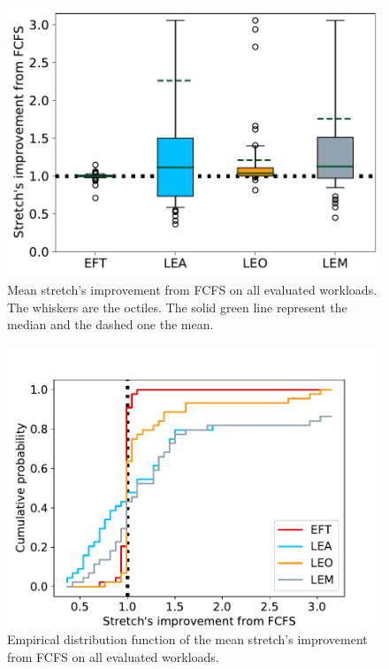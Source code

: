 \documentclass[conference,10pt]{IEEEtran}
\begin{document}
\begin{figure}[t]\centering\includegraphics[width=0.9\linewidth]{../MBSS/plot/Boxplot/box_plot_mean_stretch_all_workloads.pdf}\caption{Mean stretch's improvement from FCFS on all evaluated workloads. The whiskers are the octiles. The solid green line represent the median and the dashed one the mean.}\label{boxplot.all}\end{figure}
\begin{figure}[t]\centering\includegraphics[width=0.9\linewidth]{../MBSS/plot/ECDF/ecdf_mean_stretch_all_workloads.pdf}\caption{Empirical distribution function of the mean stretch's improvement from FCFS on all evaluated workloads.}\label{ecdf}\end{figure}
\end{document}
